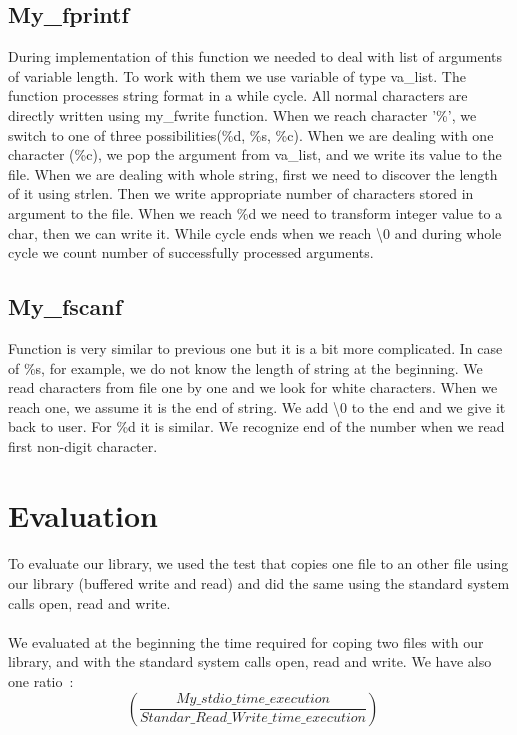 \documentclass[a4paper,10pt]{article}
\begin{document}
\subsection{My\_fprintf}
During implementation of this function we needed to deal with list of arguments of variable length. To work with them we use variable of type va\_list. The function processes string format in a while cycle. All normal characters are directly written using my\_fwrite function. When we reach character '\%', we switch to one of three possibilities(\%d, \%s, \%c). When we are dealing with one character (\%c), we pop the argument from va\_list, and we write its value to the file. When we are dealing with whole string, first we need to discover the length of it using strlen. Then we write appropriate number of characters stored in argument to the file. When we reach \%d we need to transform integer value to a char, then we can write it. While cycle ends when we reach \textbackslash 0 and during whole cycle we count number of successfully processed arguments.
\subsection{My\_fscanf}
Function is very similar to previous one but it is a bit more complicated. In case of \%s, for example, we do not know the length of string at the beginning. We read characters from file one by one and we look for white characters. When we reach one, we assume it is the end of string. We add \textbackslash 0 to the end and we give it back to user. For \%d it is similar. We recognize end of the number when we read first non-digit character.
\section{Evaluation}
\paragraph{}
To evaluate our library, we used the test that copies one file to an other file using our library (buffered write and read) and did the same  using the standard system calls open, read and write.
\paragraph{}
We evaluated at the beginning the time required for coping two files with our library,  
and with the standard system calls open, read and write. We have also one ratio~: 
\begin{equation}
\left(\frac{My\_stdio\_time\_execution}{Standar\_Read\_Write\_time\_execution} \right)  \quad
\end{equation}
\end{document}
